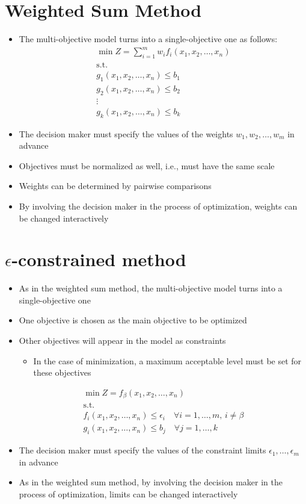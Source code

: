 \documentclass[10pt]{article}
\begin{document}
\section{Weighted Sum Method}
\begin{itemize}
    \item The multi-objective model turns into a single-objective one as follows: 
    \begin{gather*}
        \min Z = \sum_{i = 1}^{m}w_if_i(x_1, x_2, \dots, x_n)\\
        \text{s.t.}\\
        g_1(x_1, x_2, \dots, x_n) \le b_1\\
        g_2(x_1, x_2, \dots, x_n) \le b_2\\
        \vdots \\
        g_k(x_1, x_2, \dots, x_n) \le b_k
    \end{gather*}
    \item The decision maker must specify the values of the weights $w_1, w_2, \dots, w_m $ in advance 
    \item Objectives must be normalized as well, i.e., must have the same scale 
    \item Weights can be determined by pairwise comparisons 
    \item By involving the decision maker in the process of optimization, weights can be changed interactively
\end{itemize}
\newpage 
\section{$\epsilon $-constrained method}
\begin{itemize}
    \item As in the weighted sum method, the multi-objective model turns into a single-objective one 
    \item One objective is chosen as the main objective to be optimized 
    \item Other objectives will appear in the model as constraints 
    \begin{itemize}
        \item In the case of minimization, a maximum acceptable level must be set for these objectives 
    \end{itemize}
    \begin{gather*}
        \min Z = f_\beta(x_1, x_2, \dots, x_n)\\
        \text{s.t.}\\
        f_i(x_1, x_2, \dots, x_n)\le \epsilon_i\quad\forall i = 1,\dots, m,\, i \neq \beta \\
        g_i(x_1, x_2, \dots, x_n)\le b_j\quad\forall j = 1,\dots, k
    \end{gather*}
    \item The decision maker must specify the values of the constraint limits $\epsilon_1, \dots, \epsilon_m $ in advance
    \item As in the weighted sum method, by involving the decision maker in the process of optimization, limits can be changed interactively
\end{itemize}
\end{document}
